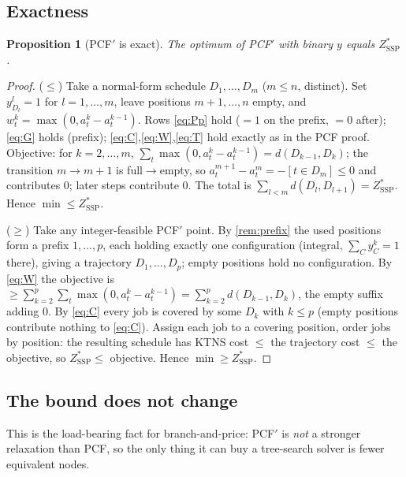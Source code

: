 \documentclass[11pt,a4paper]{article}
\theoremstyle{plain}
\newtheorem{proposition}[theorem]{Proposition}
\theoremstyle{definition}
\newcommand{\ZSSP}{Z_{\mathrm{SSP}}^{*}}
\begin{document}
\subsection{Exactness}
\begin{thmbox}
\begin{proposition}[PCF$'$ is exact]\label{prop:pcfp-exact}
The optimum of PCF$'$ with binary $y$ equals $\ZSSP$.
\end{proposition}
\end{thmbox}
\begin{proofbox}
\begin{proof}
($\le$) Take a normal-form schedule $D_1,\dots,D_m$ ($m\le n$, distinct). Set $y^l_{D_l}=1$ for
$l=1,\dots,m$, leave positions $m{+}1,\dots,n$ empty, and $w_t^k=\max(0,a_t^k-a_t^{k-1})$.
Rows \eqref{eq:Pp} hold ($=1$ on the prefix, $=0$ after); \eqref{eq:G} holds (prefix);
\eqref{eq:C},\eqref{eq:W},\eqref{eq:T} hold exactly as in the PCF proof. Objective: for
$k=2,\dots,m$, $\sum_t\max(0,a_t^k-a_t^{k-1})=d(D_{k-1},D_k)$; the transition $m\to m{+}1$ is
full$\to$empty, so $a_t^{m+1}-a_t^m=-[t\in D_m]\le0$ and contributes $0$; later steps contribute
$0$. The total is $\sum_{l<m}d(D_l,D_{l+1})=\ZSSP$. Hence $\min\le\ZSSP$.

($\ge$) Take any integer-feasible PCF$'$ point. By \cref{rem:prefix} the used positions form a
prefix $1,\dots,p$, each holding exactly one configuration (integral, $\sum_C y_C^k=1$ there),
giving a trajectory $D_1,\dots,D_p$; empty positions hold no configuration. By \eqref{eq:W} the
objective is $\ge\sum_{k=2}^{p}\sum_t\max(0,a_t^k-a_t^{k-1})=\sum_{k=2}^{p}d(D_{k-1},D_k)$, the
empty suffix adding $0$. By \eqref{eq:C} every job is covered by some $D_k$ with $k\le p$ (empty
positions contribute nothing to \eqref{eq:C}). Assign each job to a covering position, order
jobs by position: the resulting schedule has KTNS cost $\le$ the trajectory cost $\le$ the
objective, so $\ZSSP\le$ objective. Hence $\min\ge\ZSSP$.
\end{proof}
\end{proofbox}

\subsection{The bound does not change}
This is the load-bearing fact for branch-and-price: PCF$'$ is \emph{not} a stronger relaxation
than PCF, so the only thing it can buy a tree-search solver is fewer equivalent nodes.
\end{document}
